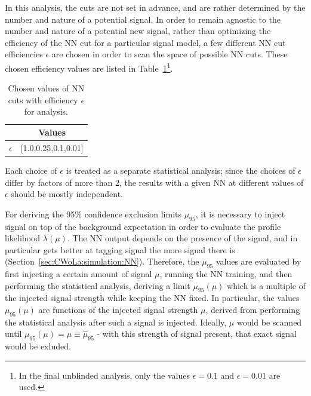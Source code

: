 In this analysis, the cuts are not set in advance, and are rather determined by the number and nature of a potential signal.
In order to remain agnostic to the number and nature of a potential new signal, rather than optimizing the efficiency of the NN cut for a particular signal model, a few different NN cut efficiencies $\epsilon$ are chosen in order to scan the space of possible NN cuts.
These chosen efficiency values are listed in Table~\ref{tab:effs}\footnote{In the final unblinded analysis, only the values $\epsilon=0.1$ and $\epsilon=0.01$ are used.}.
\begin{table}[htb]
  \centering
  \caption{Chosen values of NN cuts with efficiency $\epsilon$ for analysis.}
  \label{tab:effs}
  \begin{tabular}{c c}
    \hline
 & Values   \\ \hline
$\epsilon$ & [1.0,0.25,0.1,0.01] \\
    \hline
  \end{tabular}
\end{table}
Each choice of $\epsilon$ is treated as a separate statistical analysis; since the choices of $\epsilon$ differ by factors of more than $2$, the results with a given NN at different values of $\epsilon$ should be mostly independent.

For deriving the 95\% confidence exclusion limits $\mu_{95}$, it is necessary to inject signal on top of the background expectation in order to evaluate the profile likelihood $\lambda(\mu)$.
The NN output depends on the presence of the signal, and in particular gets better at tagging signal the more signal there is (Section~\ref{sec:CWoLa:simulation:NN}). 
Therefore, the $\mu_{95}$ values are evaluated by first injecting a certain amount of signal $\mu$, running the NN training, and then performing the statistical analysis, deriving a limit $\mu_{95}(\mu)$ which is a multiple of the injected signal strength while keeping the NN fixed. 
In particular, the values $\mu_{95}(\mu)$ are functions of the injected signal strength $\mu$, derived from performing the statistical analysis after such a signal is injected.
Ideally, $\mu$ would be scanned until $\mu_{95}(\mu)=\mu\equiv\hat{\mu}_{95}$ - with this strength of signal present, that exact signal would be exluded.

